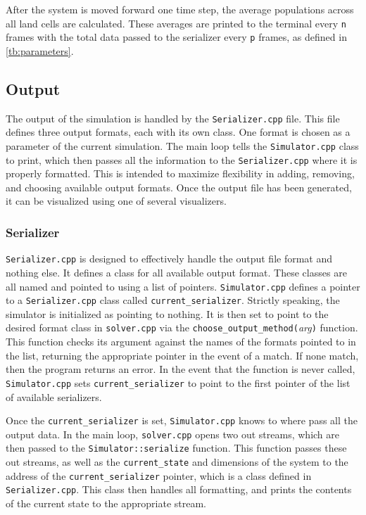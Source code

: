 \documentclass[a4paper,11pt]{article}
\begin{document}
After the system is moved forward one time step, the average populations across all land cells are calculated.  These averages are printed to the terminal every \texttt{n} frames with the total data passed to the serializer every \texttt{p} frames, as defined in \ref{tb:parameters}.

\subsection{Output}\label{output}

The output of the simulation is handled by the \texttt{Serializer.cpp} file.  This file defines three output formats, each with its own class.  One format is chosen as a parameter of the current simulation.  The main loop tells the \texttt{Simulator.cpp} class to print, which then passes all the information to the \texttt{Serializer.cpp} where it is properly formatted.   This is intended to maximize flexibility in adding, removing, and choosing available output formats.  Once the output file has been generated, it can be visualized using one of several visualizers.

\subsubsection{Serializer}

\texttt{Serializer.cpp} is designed to effectively handle the output file format and nothing else.  It defines a class for all available output format.  These classes are all named and pointed to using a list of pointers.  \texttt{Simulator.cpp} defines a pointer to a \texttt{Serializer.cpp} class called \texttt{current\_serializer}.  Strictly speaking, the simulator is initialized as pointing to nothing.  It is then set to point to the desired format class in \texttt{solver.cpp} via the \texttt{choose\_output\_method(}\emph{arg}\texttt{)} function.  This function checks its argument against the names of the formats pointed to in the list, returning the appropriate pointer in the event of a match.  If none match, then the program returns an error.  In the event that the function is never called, \texttt{Simulator.cpp} sets \texttt{current\_serializer} to point to the first pointer of the list of available serializers.  

Once the  \texttt{current\_serializer} is set, \texttt{Simulator.cpp}  knows to where pass all the output data.  In the main loop, \texttt{solver.cpp}  opens two out streams, which are then passed to the \texttt{Simulator::serialize} function.  This function passes these out streams, as well as the \texttt{current\_state} and dimensions of the system to the address of the \texttt{current\_serializer} pointer, which is a class defined in \texttt{Serializer.cpp}.  This class then handles all formatting, and prints the contents of the current state to the appropriate stream.
\end{document}
